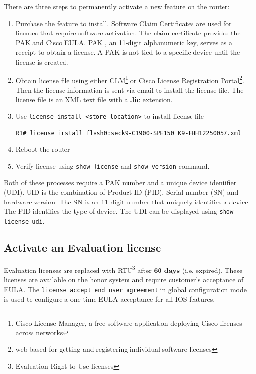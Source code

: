 There are three steps to permanently activate a new feature on the router:

\begin{enumerate}
\item Purchase the feature to install. Software Claim Certificates are used for licenses that require software activation. The claim certificate provides the PAK and Cisco EULA. PAK , an 11-digit alphanumeric key, serves as a receipt to obtain a license. A PAK
is not tied to a specific device until the license is created. 

\item Obtain license file using either CLM\footnote{Cisco License Manager, a free software application deploying Cisco licenses across networks} or Cisco License Registration Portal\footnote{web-based for getting and registering individual software licenses}. Then the license information is sent via email to install the license file. The license file is an XML  text file with a \textbf{.lic} extension.

\item Use \verb|license install <store-location>| to install license file

\begin{verbatim}
R1# license install flash0:seck9-C1900-SPE150_K9-FHH12250057.xml
\end{verbatim}

\item Reboot the router

\item Verify license using \verb|show license| and \verb|show version| command.
\end{enumerate}

Both of these processes require a PAK number and a unique device identifier (UDI). UID is the combination of Product ID (PID), Serial number (SN) and hardware version. The SN is an 11-digit number that uniquely identifies a device. The PID identifies the type of device. The UDI can be displayed using \verb|show license udi|.\\

\subsection{Activate an Evaluation license}

Evaluation licenses are replaced with RTU\footnote{Evaluation Right-to-Use licenses} after \textbf{60 days} (i.e. expired). These licenses are available on the honor system and require customer's acceptance of EULA. The \verb|license accept end user agreement| in global configuration mode is used to configure a one-time EULA acceptance for all IOS features. \\

